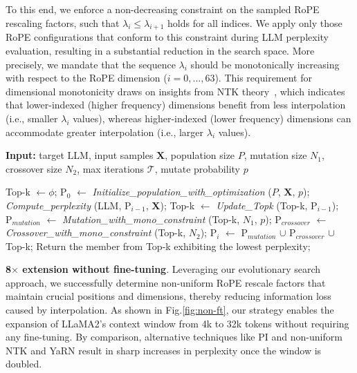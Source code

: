 To this end, we enforce a non-decreasing constraint on the sampled RoPE rescaling factors, such that $\lambda_i \le \lambda_{i+1}$ holds for all indices. We apply only those RoPE configurations that conform to this constraint during LLM perplexity evaluation, resulting in a substantial reduction in the search space. More precisely, we mandate that the sequence $\lambda_i$ should be monotonically increasing with respect to the RoPE dimension ($i = 0, \ldots, 63$). This requirement for dimensional monotonicity draws on insights from NTK theory~\cite{jacot2018neural,tancik2020fourier,ntk}, which indicates that lower-indexed (higher frequency) dimensions benefit from less interpolation (i.e., smaller $\lambda_i$ values), whereas higher-indexed (lower frequency) dimensions can accommodate greater interpolation (i.e., larger $\lambda_i$ values).

\begin{algorithm}[t]
	\small
	\caption{The search algorithm}
	\textbf{Input:} target LLM, input samples $\mathbf{X}$, population size $P$, mutation size $N_1$, crossover size $N_2$, max iterations $\mathcal{T}$, mutate probability $p$\\

	\begin{algorithmic}[1]
		\label{alg:search}
		\STATE Top-k $\leftarrow \phi$;	
		\STATE $\text{P}_0$ $\leftarrow$ \textit{Initialize\_population\_with\_optimization} ($P$, $\mathbf{X}$, $p$); 
		\STATE \textit{Compute\_perplexity} (LLM, $\text{P}_{i-1}$, $\mathbf{X}$);
		\STATE Top-k $\leftarrow$ \textit{Update\_Topk} (Top-k, $\text{P}_{i-1}$);
		\STATE $\text{P}_{mutation}$ $\leftarrow$ \textit{Mutation\_with\_mono\_constraint} (Top-k, $N_1$, $p$);
		\STATE $\text{P}_{crossover}$ $\leftarrow$ \textit{Crossover\_with\_mono\_constraint} (Top-k, $N_2$);
		\STATE $\text{P}_i$ $\leftarrow$ $\text{P}_{mutation}$ $\cup$ $\text{P}_{crossover}$ $\cup$ Top-k;
		\ENDFOR
		\STATE Return the member from Top-k exhibiting the lowest perplexity;
	\end{algorithmic}
\end{algorithm}

\textbf{8$\times$ extension without fine-tuning}. Leveraging our evolutionary search approach, we successfully determine non-uniform RoPE rescale factors that maintain crucial positions and dimensions, thereby reducing information loss caused by interpolation. As shown in Fig.\ref{fig:non-ft}, our strategy enables the expansion of LLaMA2’s context window from 4k to 32k tokens without requiring any fine-tuning. By comparison, alternative techniques like PI and non-uniform NTK and YaRN result in sharp increases in perplexity once the window is doubled.

